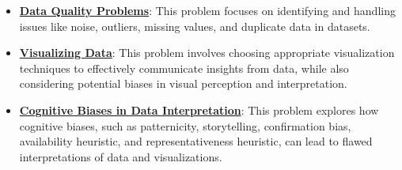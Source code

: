 \documentclass{article}%
\begin{document}
\begin{itemize}[leftmargin=*]%
\item \href{https://purdue.brightspace.com/d2l/common/assets/pdfjs-d2l-dist/1.0.14-legacy/web/viewer.html?file=\%2Fcontent\%2Fenforced\%2F1095465-WL.202510.CS24200.LE1\%2F12-truth.pdf\%3Fou\%3D1095465\&lang=en-us\&container=d2l-fileviewer-rendered-pdf\&fullscreen=d2l-fileviewer-rendered-pdf-dialog\&height=667#page=3}{\textbf{Data Quality Problems}}: This problem focuses on identifying and handling issues like noise, outliers, missing values, and duplicate data in datasets.%
\item \href{https://purdue.brightspace.com/d2l/common/assets/pdfjs-d2l-dist/1.0.14-legacy/web/viewer.html?file=\%2Fcontent\%2Fenforced\%2F1095465-WL.202510.CS24200.LE1\%2F12-truth.pdf\%3Fou\%3D1095465\&lang=en-us\&container=d2l-fileviewer-rendered-pdf\&fullscreen=d2l-fileviewer-rendered-pdf-dialog\&height=667#page=9}{\textbf{Visualizing Data}}: This problem involves choosing appropriate visualization techniques to effectively communicate insights from data, while also considering potential biases in visual perception and interpretation.%
\item \href{https://purdue.brightspace.com/d2l/common/assets/pdfjs-d2l-dist/1.0.14-legacy/web/viewer.html?file=\%2Fcontent\%2Fenforced\%2F1095465-WL.202510.CS24200.LE1\%2F12-truth.pdf\%3Fou\%3D1095465\&lang=en-us\&container=d2l-fileviewer-rendered-pdf\&fullscreen=d2l-fileviewer-rendered-pdf-dialog\&height=667#page=13}{\textbf{Cognitive Biases in Data Interpretation}}: This problem explores how cognitive biases, such as patternicity, storytelling, confirmation bias, availability heuristic, and representativeness heuristic, can lead to flawed interpretations of data and visualizations.%
\end{itemize}%
\end{document}
